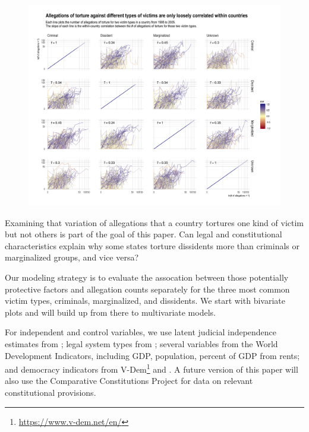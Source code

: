 \documentclass[12pt]{article}
\begin{document}
\begin{figure}
\begin{center}
\caption{}
\label{fig:correlation-matrix}
\includegraphics[width=.99\textwidth]{../output/allegations-by-victim-scatterplots.png}
\end{center}
\end{figure}

Examining that variation of allegations that a country tortures one kind of victim but not others is part of the goal of this paper. Can legal and constitutional characteristics explain why some states torture dissidents more than criminals or marginalized groups, and vice versa?

Our modeling strategy is to evaluate the assocation between those potentially protective factors and allegation counts separately for the three most common victim types, criminals, marginalized, and dissidents. We start with bivariate plots and will build up from there to multivariate models. 

For independent and control variables, we use latent judicial independence estimates from \citet{linzer2015global}; legal system types from \citet{mitchell2013domestic}; several variables from the World Development Indicators, including GDP, population, percent of GDP from rents; and democracy indicators from V-Dem\footnote{\url{https://www.v-dem.net/en/}} and \citet{cheibub2010democracy}. A future version of this paper will also use the Comparative Constitutions Project for data on relevant constitutional provisions. 
\end{document}
